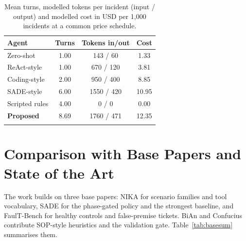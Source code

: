 \documentclass[pdflatex,sn-basic,Numbered,iicol]{sn-jnl}
\begin{document}
\begin{table}[t]
\caption{Mean turns, modelled tokens per incident (input / output) and modelled cost in USD per 1,000 incidents at a common price schedule.}\label{tab:eff}
\footnotesize
\begin{tabular}{@{}lccc@{}}
\toprule
Agent & Turns & Tokens in/out & Cost \\
\midrule
Zero-shot & 1.00 & 143 / 60 & 1.33 \\
ReAct-style & 1.00 & 670 / 120 & 3.81 \\
Coding-style & 2.00 & 950 / 400 & 8.85 \\
SADE-style & 6.00 & 1550 / 420 & 10.95 \\
Scripted rules & 4.00 & 0 / 0 & 0.00 \\
\textbf{Proposed} & 8.69 & 1760 / 471 & 12.35 \\
\botrule
\end{tabular}
\end{table}

\section{Comparison with Base Papers and State of the Art}\label{sec:base}

The work builds on three base papers: NIKA for scenario families and tool vocabulary, SADE for the phase-gated policy and the strongest baseline, and FaulT-Bench for healthy controls and false-premise tickets. BiAn and Confucius contribute SOP-style heuristics and the validation gate. Table~\ref{tab:basesum} summarises them.
\end{document}
